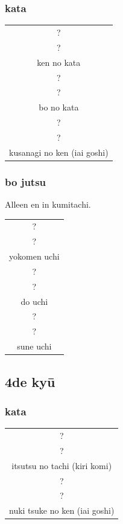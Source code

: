 \documentclass[a4paper, 12pt]{article}
\begin{document}
\begin{CJK*}{UTF8}{min}
\subsubsection{kata}
\begin{table}[H]
\begin{center}
\begin{tabular}{c}
?\\
?\\
ken no kata\\
\hline
?\\
?\\
bo no kata\\
\hline
?\\
?\\
kusanagi no ken (iai goshi)
\end{tabular}
\end{center}
\label{kyuu_5_katori_kata}
\end{table}

\subsubsection{bo jutsu}
\noindent Alleen en in kumitachi.
\begin{table}[H]
\begin{center}
\begin{tabular}{c}
?\\
?\\
yokomen uchi\\
\hline
?\\
?\\
do uchi\\
\hline
?\\
?\\
sune uchi
\end{tabular}
\end{center}
\label{kyuu_5_katori_bo}
\end{table}

\subsection{4de ky\={u}}
\subsubsection{kata}
\begin{table}[H]
\begin{center}
\begin{tabular}{c}
?\\
?\\
itsutsu no tachi (kiri komi)\\
\hline
?\\
?\\
nuki tsuke no ken (iai goshi)
\end{tabular}
\end{center}
\label{kyuu_4_katori_kata}
\end{table}


\end{CJK*}
\end{document}
